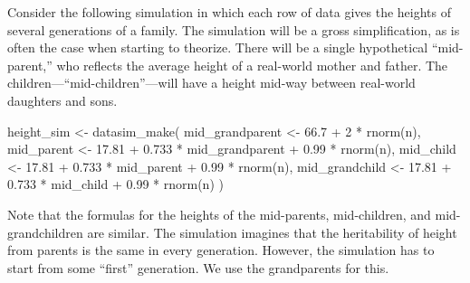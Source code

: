 \documentclass[
  letterpaper,
  DIV=11,
  numbers=noendperiod,
  oneside]{scrartcl}
\newenvironment{Shaded}{\begin{snugshade}}{\end{snugshade}}
\newcommand{\DecValTok}[1]{\textcolor[rgb]{0.68,0.00,0.00}{#1}}
\newcommand{\FloatTok}[1]{\textcolor[rgb]{0.68,0.00,0.00}{#1}}
\newcommand{\FunctionTok}[1]{\textcolor[rgb]{0.28,0.35,0.67}{#1}}
\newcommand{\NormalTok}[1]{\textcolor[rgb]{0.00,0.23,0.31}{#1}}
\newcommand{\OtherTok}[1]{\textcolor[rgb]{0.00,0.23,0.31}{#1}}
\newcommand{\SpecialCharTok}[1]{\textcolor[rgb]{0.37,0.37,0.37}{#1}}
\begin{document}
Consider the following simulation in which each row of data gives the
heights of several generations of a family. The simulation will be a
gross simplification, as is often the case when starting to theorize.
There will be a single hypothetical ``mid-parent,'' who reflects the
average height of a real-world mother and father. The
children---``mid-children''---will have a height mid-way between
real-world daughters and sons.

\begin{Shaded}
\begin{Highlighting}[]
\NormalTok{height\_sim }\OtherTok{\textless{}{-}} \FunctionTok{datasim\_make}\NormalTok{(}
\NormalTok{  mid\_grandparent }\OtherTok{\textless{}{-}} \FloatTok{66.7} \SpecialCharTok{+} \DecValTok{2} \SpecialCharTok{*} \FunctionTok{rnorm}\NormalTok{(n),}
\NormalTok{  mid\_parent }\OtherTok{\textless{}{-}} \FloatTok{17.81} \SpecialCharTok{+} \FloatTok{0.733} \SpecialCharTok{*}\NormalTok{ mid\_grandparent }\SpecialCharTok{+}  \FloatTok{0.99} \SpecialCharTok{*} \FunctionTok{rnorm}\NormalTok{(n),}
\NormalTok{  mid\_child }\OtherTok{\textless{}{-}} \FloatTok{17.81} \SpecialCharTok{+} \FloatTok{0.733} \SpecialCharTok{*}\NormalTok{ mid\_parent }\SpecialCharTok{+} \FloatTok{0.99} \SpecialCharTok{*} \FunctionTok{rnorm}\NormalTok{(n),}
\NormalTok{  mid\_grandchild }\OtherTok{\textless{}{-}} \FloatTok{17.81} \SpecialCharTok{+} \FloatTok{0.733} \SpecialCharTok{*}\NormalTok{ mid\_child }\SpecialCharTok{+} \FloatTok{0.99} \SpecialCharTok{*} \FunctionTok{rnorm}\NormalTok{(n)}
\NormalTok{)}
\end{Highlighting}
\end{Shaded}

Note that the formulas for the heights of the mid-parents, mid-children,
and mid-grandchildren are similar. The simulation imagines that the
heritability of height from parents is the same in every generation.
However, the simulation has to start from some ``first'' generation. We
use the grandparents for this.
\end{document}
